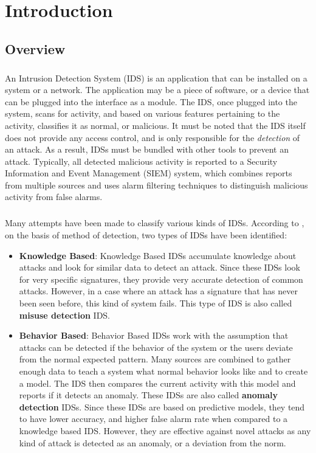 
\chapter{Introduction}
\label{ch:INTR}
\section{Overview}

\paragraph{}
An Intrusion Detection System (IDS) is an application that can be installed on a system or a network. The application may be a piece of software, or a device that can be plugged into the interface as a module. The IDS, once plugged into the system, scans for activity, and based on various features pertaining to the activity, classifies it as normal, or malicious. It must be noted that the IDS itself does not provide any access control, and is only responsible for the \textit{detection} of an attack. As a result, IDSs must be bundled with other tools to prevent an attack. Typically, all detected malicious activity is reported to a Security Information and Event Management (SIEM) system, which combines reports from multiple sources and uses alarm filtering techniques to distinguish malicious activity from false alarms.

\paragraph{}
Many attempts have been made to classify various kinds of IDSs. According to \cite{ids_taxonomy}, on the basis of method of detection, two types of IDSs have been identified:
\begin{itemize}
    \item \textbf{Knowledge Based}: Knowledge Based IDSs accumulate knowledge about attacks and look for similar data to detect an attack. Since these IDSs look for very specific signatures, they provide very accurate detection of common attacks. However, in a case where an attack has a signature that has never been seen before, this kind of system fails. This type of IDS is also called \textbf{misuse detection} IDS.

    \item \textbf{Behavior Based}: Behavior Based IDSs work with the assumption that attacks can be detected if the behavior of the system or the users deviate from the normal expected pattern. Many sources are combined to gather enough data to teach a system what normal behavior looks like and to create a model. The IDS then compares the current activity with this model and reports if it detects an anomaly. These IDSs are also called \textbf{anomaly detection} IDSs. Since these IDSs are based on predictive models, they tend to have lower accuracy, and higher false alarm rate when compared to a knowledge based IDS. However, they are effective against novel attacks as any kind of attack is detected as an anomaly, or a deviation from the norm.
\end{itemize}

